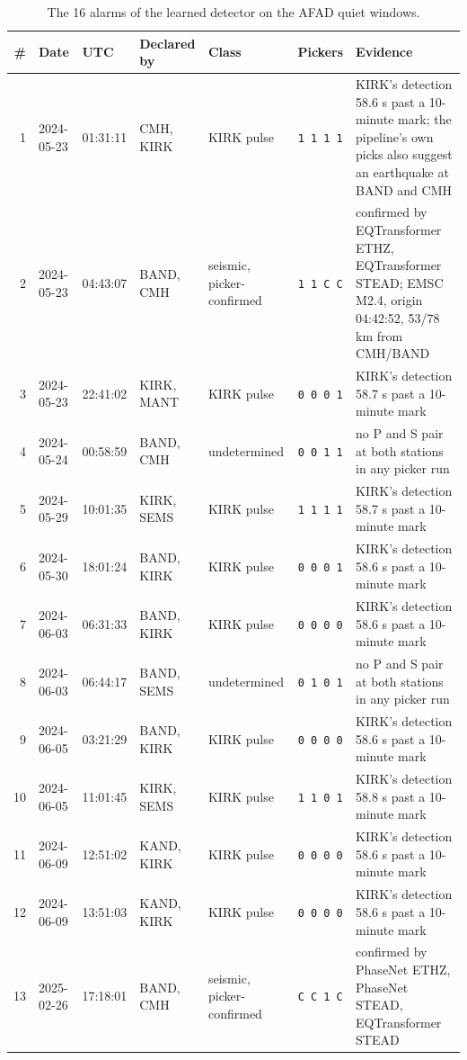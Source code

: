 \documentclass[11pt,a4paper]{article}
\begin{document}
\begin{table}[htbp]
  \centering\footnotesize\setlength{\tabcolsep}{4pt}
  \caption{The 16 alarms of the learned detector on the AFAD quiet windows.}\label{t:alarms}
  \begin{tabular}{@{}rllllcp{4.6cm}@{}}
    \toprule
    \# & Date & UTC & Declared by & Class & Pickers & Evidence \\
    \midrule
    1 & 2024-05-23 & 01:31:11 & CMH, KIRK & KIRK pulse & \texttt{1 1 1 1} & KIRK's detection 58.6 s past a 10-minute mark; the pipeline's own picks also suggest an earthquake at BAND and CMH \\
    2 & 2024-05-23 & 04:43:07 & BAND, CMH & seismic, picker-confirmed & \texttt{1 1 C C} & confirmed by EQTransformer ETHZ, EQTransformer STEAD; EMSC M2.4, origin 04:42:52, 53/78 km from CMH/BAND \\
    3 & 2024-05-23 & 22:41:02 & KIRK, MANT & KIRK pulse & \texttt{0 0 0 1} & KIRK's detection 58.7 s past a 10-minute mark \\
    4 & 2024-05-24 & 00:58:59 & BAND, CMH & undetermined & \texttt{0 0 1 1} & no P and S pair at both stations in any picker run \\
    5 & 2024-05-29 & 10:01:35 & KIRK, SEMS & KIRK pulse & \texttt{1 1 1 1} & KIRK's detection 58.7 s past a 10-minute mark \\
    6 & 2024-05-30 & 18:01:24 & BAND, KIRK & KIRK pulse & \texttt{0 0 0 1} & KIRK's detection 58.6 s past a 10-minute mark \\
    7 & 2024-06-03 & 06:31:33 & BAND, KIRK & KIRK pulse & \texttt{0 0 0 0} & KIRK's detection 58.6 s past a 10-minute mark \\
    8 & 2024-06-03 & 06:44:17 & BAND, SEMS & undetermined & \texttt{0 1 0 1} & no P and S pair at both stations in any picker run \\
    9 & 2024-06-05 & 03:21:29 & BAND, KIRK & KIRK pulse & \texttt{0 0 0 0} & KIRK's detection 58.6 s past a 10-minute mark \\
    10 & 2024-06-05 & 11:01:45 & KIRK, SEMS & KIRK pulse & \texttt{1 1 0 1} & KIRK's detection 58.8 s past a 10-minute mark \\
    11 & 2024-06-09 & 12:51:02 & KAND, KIRK & KIRK pulse & \texttt{0 0 0 0} & KIRK's detection 58.6 s past a 10-minute mark \\
    12 & 2024-06-09 & 13:51:03 & KAND, KIRK & KIRK pulse & \texttt{0 0 0 0} & KIRK's detection 58.6 s past a 10-minute mark \\
    13 & 2025-02-26 & 17:18:01 & BAND, CMH & seismic, picker-confirmed & \texttt{C C 1 C} & confirmed by PhaseNet ETHZ, PhaseNet STEAD, EQTransformer STEAD \\

\end{tabular}
\end{table}
\end{document}
